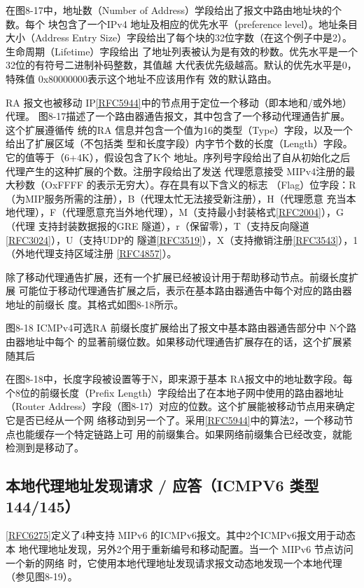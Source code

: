 在图8-17中，地址数（Number of Address）学段给出了报文中路由地址块的个数。每个
块包含了一个IPv4 地址及相应的优先水平（preference level）。地址条目大小（Address Entry
Size）字段给出了每个块的32位字数（在这个例子中是2）。生命周期（Lifetime）字段给出
了地址列表被认为是有效的秒数。优先水平是一个32位的有符号二进制补码整数，其值越
大代表优先级越高。默认的优先水平是0，特殊值 0x80000000表示这个地址不应该用作有
效的默认路由。

RA 报文也被移动 IP\href{https://www.rfc-editor.org/rfc/rfc5944}{[RFC5944]}中的节点用于定位一个移动（即本地和/或外地）代理。
图8-17描述了一个路由器通告报文，其中包含了一个移动代理通告扩展。这个扩展遵循传
统的RA 信息并包含一个值为16的类型（Type）字段，以及一个给出了扩展区域（不包括类
型和长度字段）内字节个数的长度（Length）字段。它的值等于（6+4K），假设包含了K个
地址。序列号字段给出了自从初始化之后代理产生的这种扩展的个数。注册字段给出了发送
代理愿意接受 MIPv4注册的最大秒数（OxFFFF 的表示无穷大）。存在具有以下含义的标志
（Flag）位字段：R（为MIP服务所需的注册），B（代理太忙无法接受新注册），H（代理愿意
充当本地代理），F（代理愿意充当外地代理），M（支持最小封装格式\href{https://www.rfc-editor.org/rfc/rfc2004}{[RFC2004]}），G（代理
支持封装数据报的GRE 隧道），r（保留零），T（支持反向隧道\href{https://www.rfc-editor.org/rfc/rfc3024}{[RFC3024]}），U（支持UDP的
隧道\href{https://www.rfc-editor.org/rfc/rfc3519}{[RFC3519]}），X（支持撤销注册\href{https://www.rfc-editor.org/rfc/rfc3543}{[RFC3543]}），1（外地代理支持区域注册 \href{https://www.rfc-editor.org/rfc/rfc4857}{[RFC4857]}）。

除了移动代理通告扩展，还有一个扩展已经被设计用于帮助移动节点。前缀长度扩展
可能位于移动代理通告扩展之后，表示在基本路由器通告中每个对应的路由器地址的前缀长
度。其格式如图8-18所示。

图8-18 ICMPv4可选RA 前缀长度扩展给出了报文中基本路由器通告部分中 N个路由器地址中每个
的显著前缀位数。如果移动代理通告扩展存在的话，这个扩展紧随其后

在图8-18中，长度字段被设置等于N，即来源于基本 RA报文中的地址数字段。每
个8位的前缀长度（Prefix Length）字段给出了在本地子网中使用的路由器地址（Router
Address）字段（图8-17）对应的位数。这个扩展能被移动节点用来确定它是否已经从一个网
络移动到另一个了。采用\href{https://www.rfc-editor.org/rfc/rfc5944}{[RFC5944]}中的算法2，一个移动节点也能缓存一个特定链路上可
用的前缀集合。如果网络前缀集合已经改变，就能检测到是移动了。

\subsection{本地代理地址发现请求 / 应答（ICMPV6 类型 144/145）}
\href{https://www.rfc-editor.org/rfc/rfc6275}{[RFC6275]}定义了4种支持 MIPv6 的ICMPv6报文。其中2个ICMPv6报文用于动态本
地代理地址发现，另外2个用于重新编号和移动配置。当一个 MIPv6 节点访问一个新的网络
时，它使用本地代理地址发现请求报文动态地发现一个本地代理（参见图8-19）。

